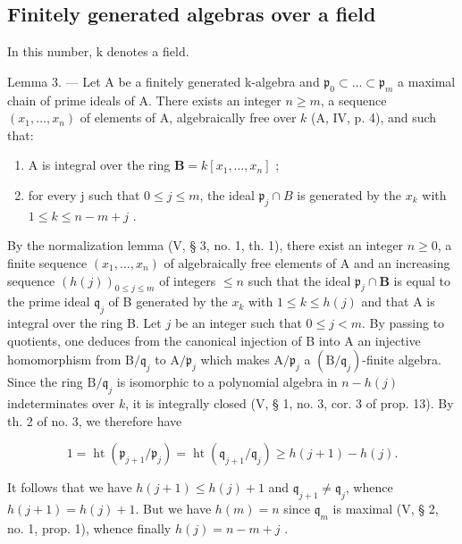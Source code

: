 \subsection{Finitely generated algebras over a field}

In this number, k denotes a field.

Lemma 3. --- Let A be a finitely generated k-algebra and \(\mathfrak{p}_{0} \subset \ldots \subset \mathfrak{p}_{m}\) a maximal chain of prime ideals of A. There exists an integer \(n \geqslant m\), a sequence \((x_{1}, \ldots, x_{n})\) of elements of A, algebraically free over \(k\) (A, IV, p. 4), and such that:

\begin{enumerate}
\def\labelenumi{\alph{enumi})}
\item
  A is integral over the ring \(\mathbf{B} = k[x_1, \ldots, x_n]\) ;
\item
  for every j such that \(0 \leqslant j \leqslant m\), the ideal \(\mathfrak{p}_{j} \cap B\) is generated by the \(x_{k}\) with \(1 \leqslant k \leqslant n - m + j\) .
\end{enumerate}

By the normalization lemma (V, § 3, no. 1, th. 1), there exist an integer \(n \geqslant 0\), a finite sequence \((x_1, ..., x_n)\) of algebraically free elements of A and an increasing sequence \((h(j))_{0 \leqslant j \leqslant m}\) of integers \(\leqslant n\) such that the ideal \(\mathfrak{p}_j \cap \mathbf{B}\) is equal to the prime ideal \(\mathfrak{q}_j\) of B generated by the \(x_k\) with \(1 \leqslant k \leqslant h(j)\) and that A is integral over the ring B. Let \(j\) be an integer such that \(0 \leqslant j < m\). By passing to quotients, one deduces from the canonical injection of B into A an injective homomorphism from \(\mathrm{B} / \mathfrak{q}_j\) to \(\mathrm{A} / \mathfrak{p}_j\) which makes \(\mathrm{A} / \mathfrak{p}_j\) a \((\mathrm{B} / \mathfrak{q}_j)\)-finite algebra. Since the ring \(\mathrm{B} / \mathfrak{q}_j\) is isomorphic to a polynomial algebra in \(n - h(j)\) indeterminates over \(k\), it is integrally closed (V, § 1, no. 3, cor. 3 of prop. 13). By th. 2 of no. 3, we therefore have

\[
1 = \operatorname{ht} \left(\mathfrak {p} _ {j + 1} / \mathfrak {p} _ {j}\right) = \operatorname{ht} \left(\mathfrak {q} _ {j + 1} / \mathfrak {q} _ {j}\right) \geqslant h (j + 1) - h (j).
\]

It follows that we have \(h(j + 1) \leqslant h(j) + 1\) and \(\mathfrak{q}_{j+1} \neq \mathfrak{q}_j\), whence \(h(j + 1) = h(j) + 1\). But we have \(h(m) = n\) since \(\mathfrak{q}_m\) is maximal (V, § 2, no. 1, prop. 1), whence finally \(h(j) = n - m + j\) .


